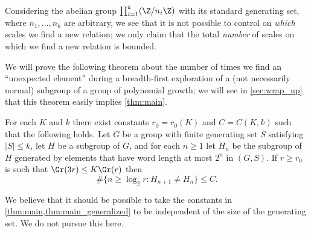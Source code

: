 \begin{remark}
Considering the abelian group $\prod_{i=1}^k(\Z/n_i \Z)$ with its standard generating set, where $n_1,\ldots,n_k$ are arbitrary, we see that it is not possible to control on \emph{which} scales we find a new relation; we only claim that the total \emph{number} of scales on which we find a new relation is bounded.
\end{remark}

We will prove the following theorem about the number of times we find an ``unexpected element'' during a breadth-first exploration of a (not necessarily normal) subgroup of a group of polynomial growth; we will see in \cref{sec:wrap_up} that this theorem easily implies \cref{thm:main}.

\begin{thm}
\label{thm:main_generalized}
For each $K$ and $k$ there exist constants $r_0=r_0(K)$ and $C=C(K,k)$ such that the following holds.
Let $G$ be a group with finite generating set $S$ satisfying $|S|\leq k$, let $H$ be a subgroup of $G$, and for each $n\geq 1$ let $H_n$ be the subgroup of $H$ generated by elements that have word length at most $2^n$ in $(G,S)$. If $r\geq r_0$ is such that $\Gr(3r)\leq K \Gr(r)$ then 
\[
\#\{n \geq \log_2 r :H_{n+1}\neq H_n\} \leq C.
\]
\end{thm}

\medskip

\begin{remark}
We believe that it should be possible to take the constants in \cref{thm:main,thm:main_generalized} to be independent of the size of the generating set. We do not pursue this here.
\end{remark}
